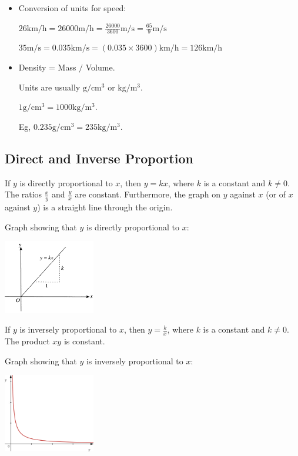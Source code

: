 \documentclass[twocolumn]{article}
\begin{document}
\begin{itemize}
\item Conversion of units for speed:

$26 \text{km}/\text{h} = 26000 \text{m}/\text{h} = \frac{26000}{3600}  \text{m}/\text{s} = \frac{65}{9} \text{m}/\text{s} $

$35 \text{m}/\text{s} = 0.035 \text{km}/\text{s} = (0.035 \times 3600) \text{km}/\text{h} = 126 \text{km}/\text{h}$

\item Density = Mass $/$ Volume.

Units are usually $\text{g}/\text{cm}^3$ or $\text{kg}/\text{m}^3$.

$1 \text{g}/\text{cm}^3 = 1000 \text{kg}/\text{m}^3$.

Eg, $0.235 \text{g}/\text{cm}^3 = 235 \text{kg}/\text{m}^3$.

\end{itemize}  

\subsection*{Direct and Inverse Proportion}

\noindent 
If $y$ is directly proportional to $x$, then $y=k x$, where $k$ is a constant and $k \neq 0$. The ratios $\frac{x}{y}$ and $\frac{y}{x}$ are constant. Furthermore, the graph on $y$ against $x$ (or of $x$ against $y$) is a straight line through the origin.

\noindent
Graph showing that $y$ is directly proportional to  $x$:

\includegraphics[width=0.3\textwidth]{01.png}

\bigskip 

\noindent 
If $y$ is inversely proportional to $x$, then $y=\frac{k}{x}$, where $k$ is a constant and $k \neq 0$. The product $xy$ is constant. 

\noindent
Graph showing that $y$ is inversely proportional to  $x$:

\includegraphics[width=0.3\textwidth]{02.png}
\end{document}
